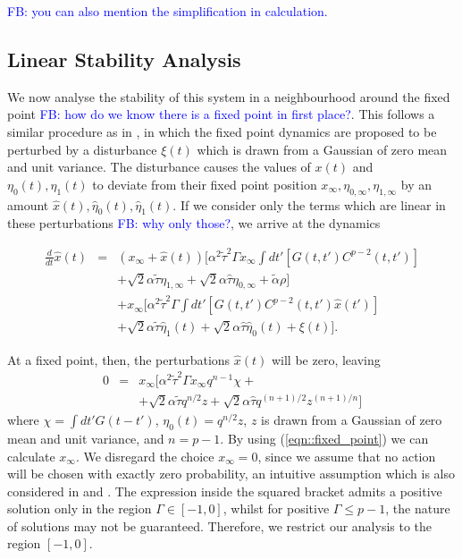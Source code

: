 \documentclass[sigconf,anonymous]{aamas}
\newcommand{\talpha}{\tilde{\alpha}}
\newcommand{\ttau}{\tilde{\tau}}
\newcommand{\htau}{\hat{\tau}}
\newcommand{\xfixed}{x_\infty}
\newcommand{\ezerof}{\eta_{0, \infty}}
\newcommand{\eonef}{\eta_{1, \infty}}
\newcommand{\xpert}{\hat{x}(t)}
\newcommand{\xpertdash}{\hat{x}(t')}
\newcommand{\ezeropert}{\hat{\eta}_0(t)}
\newcommand{\eonepert}{\hat{\eta}_1(t)}
\newcommand\fb[1]{\textcolor{blue}{FB: #1}}
\begin{document}
\fb{you can also mention the simplification in calculation.}


\subsection{Linear Stability Analysis}

We now analyse the stability of this system in a neighbourhood around
the fixed point \fb{how do we know there is a fixed point in first
  place?}. This follows a similar procedure as in \cite{Opper1992}, in
which the fixed point dynamics are proposed to be perturbed by a
disturbance $\xi(t)$ which is drawn from a Gaussian of zero mean and
unit variance. The disturbance causes the values of $x(t)$ and
$\eta_0(t), \eta_1(t)$ to deviate from their fixed point position
$\xfixed, \ezerof, \eonef$ by an amount $\xpert, \ezeropert,
\eonepert$.  If we consider only the terms which are linear in these
perturbations \fb{why only those?}, we arrive at the dynamics

\begin{eqnarray}
\frac{d}{dt} \xpert & = & (\xfixed + \xpert) [ \alpha^2 \ttau^2 \Gamma \xfixed \int dt' [ G(t, t')C^{p - 2}(t, t') ] \nonumber \\
  & & + \sqrt{2} \alpha \ttau \eonef + \sqrt{2} \alpha \htau \ezerof + \talpha \rho] \nonumber \\
& &  + \xfixed [\alpha^2 \ttau^2 \Gamma \int dt' [ G(t, t')C^{p - 2}(t, t') \xpertdash ] \nonumber \\
  & & + \sqrt{2} \alpha \ttau \eonepert + \sqrt{2} \alpha \htau \ezeropert + \xi(t)].
\label{eqn::Linearised}
\end{eqnarray}

At a fixed point, then, the perturbations $\xpert$ will be zero, leaving
%
\begin{eqnarray}
    0 & = & \xfixed [ \alpha^2 \ttau^2 \Gamma \xfixed q^{n-1} \chi + \nonumber \\
      &  & + \sqrt{2} \alpha \ttau q^{n/2}z + \sqrt{2} \alpha \htau q^{(n+1)/2} z^{(n+1)/n}]
    \label{eqn::fixed_point}
\end{eqnarray}
%
where $\chi = \int dt' G(t - t')$, $\eta_0(t) = q^{n/2}z$, $z$ is
drawn from a Gaussian of zero mean and unit variance, and $n = p -
1$. By using (\ref{eqn::fixed_point}) we can
calculate $\xfixed$. We disregard the choice $\xfixed = 0$, since we
assume that no action will be chosen with exactly zero probability, an
intuitive assumption which is also considered in \cite{Sanders2018}
and \cite{Coolen2005}. The expression inside the squared bracket
admits a positive solution only in the region $\Gamma \in [-1, 0]$,
whilst for positive $\Gamma \leq p -1$, the nature of solutions may
not be guaranteed. Therefore, we restrict our analysis to the region
$[-1, 0]$.
\end{document}
